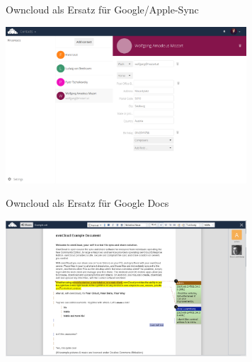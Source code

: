   \begin{frame}{Owncloud als Ersatz für Google/Apple-Sync}
    \begin{center}
      \includegraphics[width=9cm]{img/owncloud-contacts.png}
    \end{center}
  \end{frame}

  \begin{frame}{Owncloud als Ersatz für Google Docs}
    \begin{center}
      \includegraphics[width=9cm]{img/owncloud-documents.png}
    \end{center}
  \end{frame}

